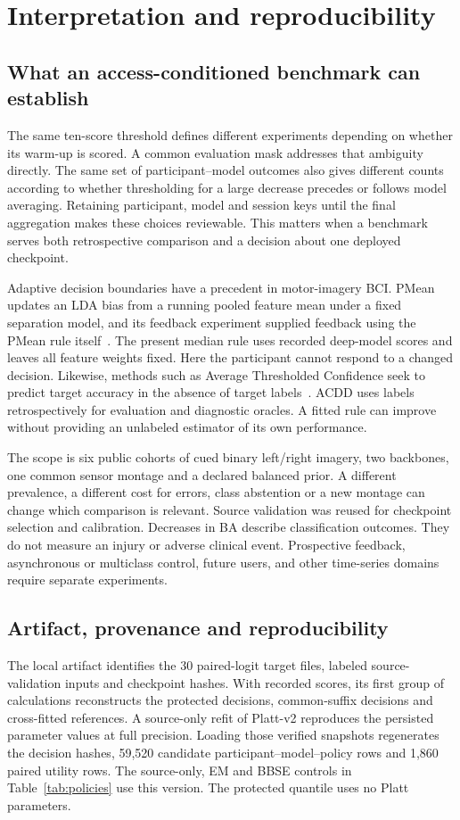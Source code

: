 \section{Interpretation and reproducibility}\label{sec:limits}
\subsection{What an access-conditioned benchmark can establish}
The same ten-score threshold defines different experiments depending on whether its warm-up is scored. A common evaluation mask addresses that ambiguity directly. The same set of participant--model outcomes also gives different counts according to whether thresholding for a large decrease precedes or follows model averaging. Retaining participant, model and session keys until the final aggregation makes these choices reviewable. This matters when a benchmark serves both retrospective comparison and a decision about one deployed checkpoint.

Adaptive decision boundaries have a precedent in motor-imagery BCI. PMean updates an LDA bias from a running pooled feature mean under a fixed separation model, and its feedback experiment supplied feedback using the PMean rule itself~\cite{vidaurre2011}. The present median rule uses recorded deep-model scores and leaves all feature weights fixed. Here the participant cannot respond to a changed decision. Likewise, methods such as Average Thresholded Confidence seek to predict target accuracy in the absence of target labels~\cite{garg2022atc}. ACDD uses labels retrospectively for evaluation and diagnostic oracles. A fitted rule can improve without providing an unlabeled estimator of its own performance.

The scope is six public cohorts of cued binary left/right imagery, two backbones, one common sensor montage and a declared balanced prior. A different prevalence, a different cost for errors, class abstention or a new montage can change which comparison is relevant. Source validation was reused for checkpoint selection and calibration. Decreases in BA describe classification outcomes. They do not measure an injury or adverse clinical event. Prospective feedback, asynchronous or multiclass control, future users, and other time-series domains require separate experiments.

\subsection{Artifact, provenance and reproducibility}
The local artifact identifies the 30 paired-logit target files, labeled source-validation inputs and checkpoint hashes. With recorded scores, its first group of calculations reconstructs the protected decisions, common-suffix decisions and cross-fitted references. A source-only refit of Platt-v2 reproduces the persisted parameter values at full precision. Loading those verified snapshots regenerates the decision hashes, 59,520 candidate participant--model--policy rows and 1,860 paired utility rows. The source-only, EM and BBSE controls in Table~\ref{tab:policies} use this version. The protected quantile uses no Platt parameters.

